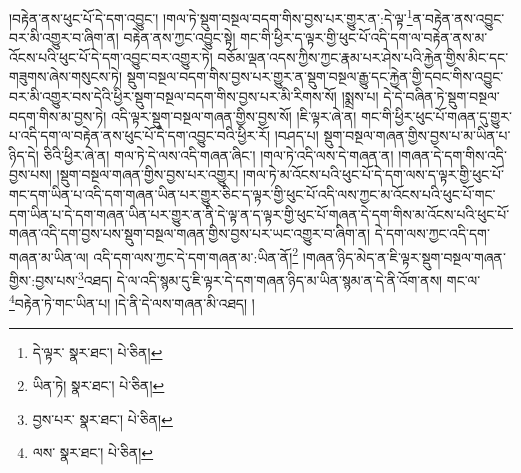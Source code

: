 །བརྟེན་ནས་ཕུང་པོ་དེ་དག་འབྱུང་། །གལ་ཏེ་སྡུག་བསྔལ་བདག་གིས་བྱས་པར་གྱུར་ན་:དེ་ལྟ་\footnote{དེ་ལྟར་  སྣར་ཐང་།  པེ་ཅིན། }ན་བརྟེན་ནས་འབྱུང་བར་མི་འགྱུར་བ་ཞིག་ན། བརྟེན་ནས་ཀྱང་འབྱུང་སྟེ། གང་གི་ཕྱིར་ད་ལྟར་གྱི་ཕུང་པོ་འདི་དག་ལ་བརྟེན་ནས་མ་འོངས་པའི་ཕུང་པོ་དེ་དག་འབྱུང་བར་འགྱུར་ཏེ། བཅོམ་ལྡན་འདས་ཀྱིས་ཀྱང་རྣམ་པར་ཤེས་པའི་རྐྱེན་གྱིས་མིང་དང་གཟུགས་ཞེས་གསུངས་ཏེ། སྡུག་བསྔལ་བདག་གིས་བྱས་པར་གྱུར་ན་སྡུག་བསྔལ་རྒྱུ་དང་རྐྱེན་གྱི་དབང་གིས་འབྱུང་བར་མི་འགྱུར་བས་དེའི་ཕྱིར་སྡུག་བསྔལ་བདག་གིས་བྱས་པར་མི་རིགས་སོ། །སྨྲས་པ། དེ་དེ་བཞིན་ཏེ་སྡུག་བསྔལ་བདག་གིས་མ་བྱས་ཏེ། འདི་ལྟར་སྡུག་བསྔལ་གཞན་གྱིས་བྱས་སོ། །ཇི་ལྟར་ཞེ་ན། གང་གི་ཕྱིར་ཕུང་པོ་གཞན་དུ་གྱུར་པ་འདི་དག་ལ་བརྟེན་ནས་ཕུང་པོ་དེ་དག་འབྱུང་བའི་ཕྱིར་རོ། །བཤད་པ། སྡུག་བསྔལ་གཞན་གྱིས་བྱས་པ་མ་ཡིན་པ་ཉིད་དེ། ཅིའི་ཕྱིར་ཞེ་ན། གལ་ཏེ་དེ་ལས་འདི་གཞན་ཞིང་། །གལ་ཏེ་འདི་ལས་དེ་གཞན་ན། །གཞན་དེ་དག་གིས་འདི་བྱས་པས། །སྡུག་བསྔལ་གཞན་གྱིས་བྱས་པར་འགྱུར། །གལ་ཏེ་མ་འོངས་པའི་ཕུང་པོ་དེ་དག་ལས་ད་ལྟར་གྱི་ཕུང་པོ་གང་དག་ཡིན་པ་འདི་དག་གཞན་ཡིན་པར་གྱུར་ཅིང་ད་ལྟར་གྱི་ཕུང་པོ་འདི་ལས་ཀྱང་མ་འོངས་པའི་ཕུང་པོ་གང་དག་ཡིན་པ་དེ་དག་གཞན་ཡིན་པར་གྱུར་ན་ནི་དེ་ལྟ་ན་ད་ལྟར་གྱི་ཕུང་པོ་གཞན་དེ་དག་གིས་མ་འོངས་པའི་ཕུང་པོ་གཞན་འདི་དག་བྱས་པས་སྡུག་བསྔལ་གཞན་གྱིས་བྱས་པར་ཡང་འགྱུར་བ་ཞིག་ན། དེ་དག་ལས་ཀྱང་འདི་དག་གཞན་མ་ཡིན་ལ། འདི་དག་ལས་ཀྱང་དེ་དག་གཞན་མ་:ཡིན་ནོ།\footnote{ཡིན་ཏེ།  སྣར་ཐང་།  པེ་ཅིན། } །གཞན་ཉིད་མེད་ན་ཇི་ལྟར་སྡུག་བསྔལ་གཞན་གྱིས་:བྱས་པས་\footnote{བྱས་པར་  སྣར་ཐང་།  པེ་ཅིན། }འཐད། དེ་ལ་འདི་སྙམ་དུ་ཇི་ལྟར་དེ་དག་གཞན་ཉིད་མ་ཡིན་སྙམ་ན་དེ་ནི་འོག་ནས། གང་ལ་\footnote{ལས་  སྣར་ཐང་།  པེ་ཅིན། }བརྟེན་ཏེ་གང་ཡིན་པ། །དེ་ནི་དེ་ལས་གཞན་མི་འཐད། །
